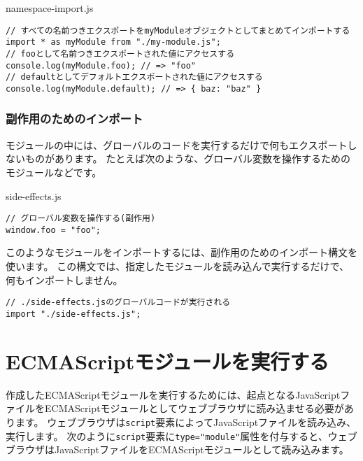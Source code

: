 \begin{listtitle}
namespace-import.js
\end{listtitle}
\begin{lstlisting}
// すべての名前つきエクスポートをmyModuleオブジェクトとしてまとめてインポートする
import * as myModule from "./my-module.js";
// fooとして名前つきエクスポートされた値にアクセスする
console.log(myModule.foo); // => "foo"
// defaultとしてデフォルトエクスポートされた値にアクセスする
console.log(myModule.default); // => { baz: "baz" }
\end{lstlisting}
\listend

\hypertarget{import-for-side-effect}{%
\subsubsection{副作用のためのインポート}\label{import-for-side-effect}}

モジュールの中には、グローバルのコードを実行するだけで何もエクスポートしないものがあります。
たとえば次のような、グローバル変数を操作するためのモジュールなどです。

\begin{listtitle}
side-effects.js
\end{listtitle}
\begin{lstlisting}
// グローバル変数を操作する(副作用)
window.foo = "foo";
\end{lstlisting}
\listend

このようなモジュールをインポートするには、副作用のためのインポート構文を使います。
この構文では、指定したモジュールを読み込んで実行するだけで、何もインポートしません。\enlargethispage{\baselineskip}

\begin{lstlisting}
// ./side-effects.jsのグローバルコードが実行される
import "./side-effects.js";
\end{lstlisting}

\hypertarget{run-es-modules}{%
\section{ECMAScriptモジュールを実行する}\label{run-es-modules}}

作成したECMAScriptモジュールを実行するためには、起点となるJavaScriptファイルをECMAScriptモジュールとしてウェブブラウザに読み込ませる必要があります。
ウェブブラウザは\texttt{script}要素によってJavaScriptファイルを読み込み、実行します。
次のように\texttt{script}要素に\texttt{type="module"}属性を付与すると、ウェブブラウザはJavaScriptファイルをECMAScriptモジュールとして読み込みます。

